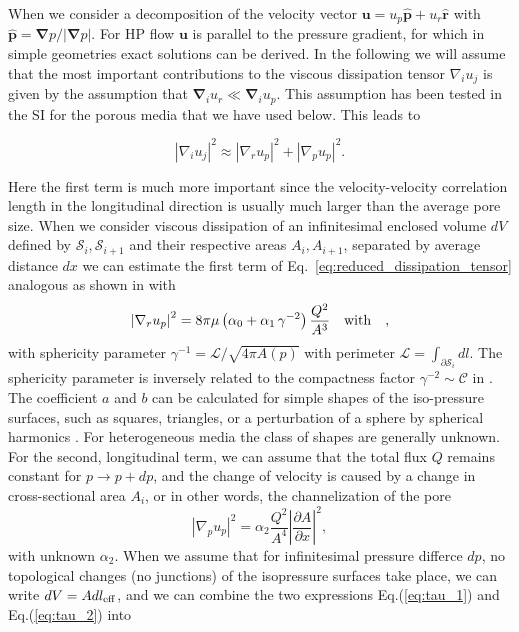 \documentclass[draft]{agujournal2019}
\begin{document}
When we consider a decomposition of the velocity vector  $\mathbf{u} = u_p \mathbf{\hat{p}} + u_r \mathbf{\hat{r}}$ with $\mathbf{\hat{p}} =\mathbf{ \nabla}p/|\mathbf{ \nabla}p|$. For HP flow $\mathbf{u}$ is parallel to the pressure gradient, for which in simple geometries exact solutions can be derived. In the following we will assume that the most important contributions to the viscous dissipation tensor $\nabla_i u_j$ is given by the assumption that $\mathbf{\nabla}_i u_r \ll \mathbf{\nabla}_i u_p $. This assumption has been tested in the SI for the porous media that we have used below. This leads to 

\begin{equation}
\left|\nabla_i u_j\right|^2 \approx  \left|\nabla_r u_p\right|^2 + \left|\nabla_p u_p\right|^2 .\label{eq:reduced_dissipation_tensor}
\end{equation}

Here the first term is much more important since the velocity-velocity correlation length in the longitudinal direction is usually much larger than the average pore size. When we consider viscous dissipation of an infinitesimal enclosed volume $dV$ defined by $\mathcal{S}_i,\mathcal{S}_{i+1}$ and their respective areas $A_i, A_{i+1}$, separated by average distance $dx$ we can estimate the first term of Eq.~\ref{eq:reduced_dissipation_tensor} analogous as shown in \cite{mortensen_reexamination_2005} with
\begin{equation}
	\left|\nabla_r u_p\right|^2 =8\pi\mu \left(\alpha_0+\alpha_1\,\gamma^{-2}\right)\frac{ Q^2}{A^3}~~~ \rm{with}~~~ ,\label{eq:tau_1}
\end{equation}
with sphericity parameter $\gamma^{-1} = \mathcal{L}/\sqrt{ 4\pi A(p)}$ with perimeter $\mathcal{L} = \int_{\partial \mathcal{S}_i}dl$. The sphericity parameter is inversely related to the compactness factor $\gamma^{-2}\sim \mathcal{C}$ in \cite{mortensen_reexamination_2005}. The coefficient $a$ and $b$ can be calculated for simple shapes of the iso-pressure surfaces, such as squares, triangles, or a perturbation of a sphere by spherical harmonics . For heterogeneous media the class of shapes are generally unknown. For the second, longitudinal term, we can assume that the total flux $Q$ remains constant for $p\rightarrow p+dp$, and the change of velocity is caused by a change in cross-sectional area $A_i$, or in other words, the channelization of the pore 
\begin{equation}
	\left|\nabla_p u_p\right|^2 = \alpha_2  \frac{Q^2}{A^4}\left|\frac{\partial A}{\partial x }\right|^2,\label{eq:tau_2}
\end{equation}
with unknown $\alpha_2$. When we assume that for infinitesimal pressure differce $dp$, no topological changes (no junctions) of the isopressure surfaces take place, we can write $dV = A dl_{\rm{eff}}$, and we can combine the two expressions Eq.(\ref{eq:tau_1}) and Eq.(\ref{eq:tau_2}) into
\end{document}
